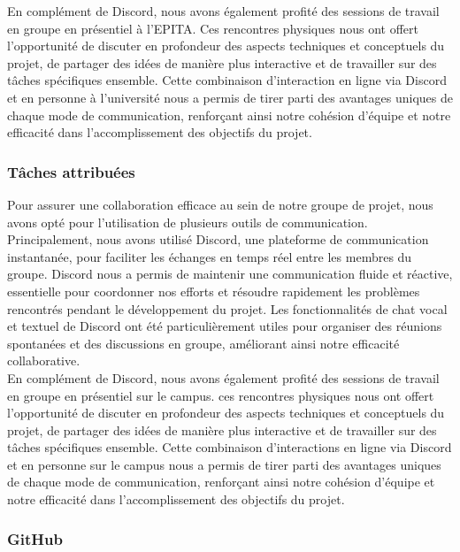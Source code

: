 En complément de Discord, nous avons également profité des sessions de travail en groupe en présentiel à l'EPITA. Ces rencontres physiques nous ont offert l'opportunité de discuter en profondeur des aspects techniques et conceptuels du projet, de partager des idées de manière plus interactive et de travailler sur des tâches spécifiques ensemble. Cette combinaison d'interaction en ligne via Discord et en personne à l'université nous a permis de tirer parti des avantages uniques de chaque mode de communication, 
renforçant ainsi notre cohésion d'équipe et notre efficacité dans l'accomplissement des objectifs du projet. 
\\

\subsubsection{Tâches attribuées}

Pour assurer une collaboration efficace au sein de notre groupe de projet, nous avons opté pour l'utilisation de plusieurs outils de communication. 
Principalement, nous avons utilisé Discord, une plateforme de communication instantanée, pour faciliter les échanges en temps réel entre les membres du groupe. 
Discord nous a permis de maintenir une communication fluide et réactive, essentielle pour coordonner nos efforts et résoudre rapidement les problèmes rencontrés pendant le développement du projet. 
Les fonctionnalités de chat vocal et textuel de Discord ont été particulièrement utiles pour organiser des réunions spontanées et des discussions en groupe, améliorant ainsi notre efficacité collaborative.
\\

En complément de Discord, nous avons également profité des sessions de travail en groupe en présentiel sur le campus. 
ces rencontres physiques nous ont offert l'opportunité de discuter en profondeur des aspects techniques et conceptuels du projet, de partager des idées de manière plus interactive et de travailler sur des tâches spécifiques ensemble. 
Cette combinaison d'interactions en ligne via Discord et en personne sur le campus nous a permis de tirer parti des avantages uniques de chaque mode de communication, renforçant ainsi notre cohésion d'équipe et notre efficacité dans l'accomplissement des objectifs du projet.
\\

\subsubsection{GitHub}

